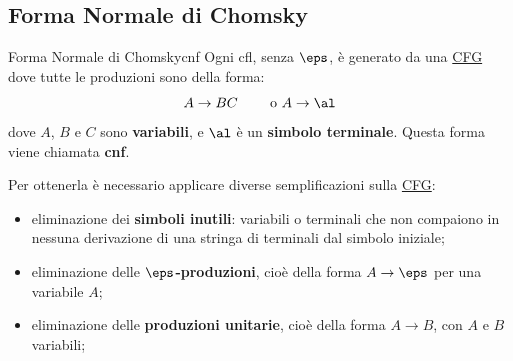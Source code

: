 \subsection{Forma Normale di Chomsky}\label{sub:ll_forma_normale_di_chomsky} %
\begin{definition}{Forma Normale di Chomsky}{cnf}
    Ogni \ac{cfl}, senza $\eps$, è generato da una \hyperref[def:cfg]{CFG} dove tutte le produzioni sono della forma:
    \[
        A\to BC\qquad \text{ o } A\to\al
    \]
    dove $A$, $B$ e $C$ sono \textbf{variabili}, e $\al$ è un \textbf{simbolo terminale}.
    Questa forma viene chiamata \textbf{\ac{cnf}}.
\end{definition}
Per ottenerla è necessario applicare diverse semplificazioni sulla \hyperref[def:cfg]{CFG}:
\begin{itemize}
    \item eliminazione dei \textbf{simboli inutili}: variabili o terminali che non compaiono in nessuna derivazione di una stringa di terminali dal simbolo iniziale;
    \item eliminazione delle \textbf{$\eps$-produzioni}, cioè della forma $A\to\eps$ per una variabile $A$;
    \item eliminazione delle \textbf{produzioni unitarie}, cioè della forma $A\to B$, con $A$ e $B$ variabili;
\end{itemize}
%
